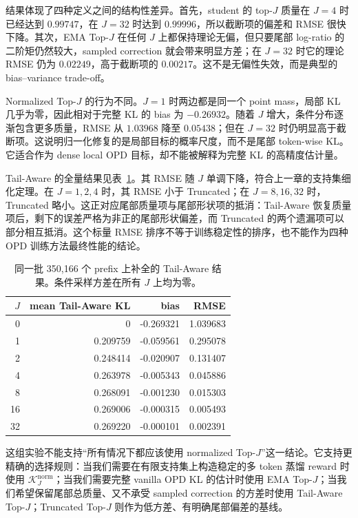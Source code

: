 结果体现了四种定义之间的结构性差异。首先，student 的 top-$J$ 质量在 $J=4$ 时已经达到 $0.99747$，在 $J=32$ 时达到 $0.99996$，所以截断项的偏差和 RMSE 很快下降。其次，EMA Top-$J$ 在任何 $J$ 上都保持理论无偏，但只要尾部 log-ratio 的二阶矩仍然较大，sampled correction 就会带来明显方差；在 $J=32$ 时它的理论 RMSE 仍为 $0.02249$，高于截断项的 $0.00217$。这不是无偏性失效，而是典型的 bias--variance trade-off。

Normalized Top-$J$ 的行为不同。$J=1$ 时两边都是同一个 point mass，局部 KL 几乎为零，因此相对于完整 KL 的 bias 为 $-0.26932$。随着 $J$ 增大，条件分布逐渐包含更多质量，RMSE 从 $1.03968$ 降至 $0.05438$；但在 $J=32$ 时仍明显高于截断项。这说明归一化修复的是局部目标的概率尺度，而不是尾部 token-wise KL。它适合作为 dense local OPD 目标，却不能被解释为完整 KL 的高精度估计量。

Tail-Aware 的全量结果见表~\ref{tab:qwen-tail-aware}。其 RMSE 随 $J$ 单调下降，符合上一章的支持集细化定理。在 $J=1,2,4$ 时，其 RMSE 小于 Truncated；在 $J=8,16,32$ 时，Truncated 略小。这正对应尾部质量项与尾部形状项的抵消：Tail-Aware 恢复质量项后，剩下的误差严格为非正的尾部形状偏差，而 Truncated 的两个遗漏项可以部分相互抵消。这个标量 RMSE 排序不等于训练稳定性的排序，也不能作为四种 OPD 训练方法最终性能的结论。

\begin{table}[ht]
\centering
\caption{同一批 350,166 个 prefix 上补全的 Tail-Aware 结果。条件采样方差在所有 $J$ 上均为零。}
\label{tab:qwen-tail-aware}
\begin{tabular}{rrrr}
\toprule
$J$ & mean Tail-Aware KL & bias & RMSE\\
\midrule
0 & 0 & -0.269321 & 1.039683\\
1 & 0.209759 & -0.059561 & 0.295078\\
2 & 0.248414 & -0.020907 & 0.131407\\
4 & 0.263978 & -0.005343 & 0.045886\\
8 & 0.268091 & -0.001230 & 0.015303\\
16 & 0.269006 & -0.000315 & 0.005493\\
32 & 0.269220 & -0.000101 & 0.002391\\
\bottomrule
\end{tabular}
\end{table}

这组实验不能支持“所有情况下都应该使用 normalized Top-$J$”这一结论。它支持更精确的选择规则：当我们需要在有限支持集上构造稳定的多 token 蒸馏 reward 时使用 $\mathcal K_J^{\mathrm{norm}}$；当我们需要完整 vanilla OPD KL 的估计时使用 EMA Top-$J$；当我们希望保留尾部总质量、又不承受 sampled correction 的方差时使用 Tail-Aware Top-$J$；Truncated Top-$J$ 则作为低方差、有明确尾部偏差的基线。
